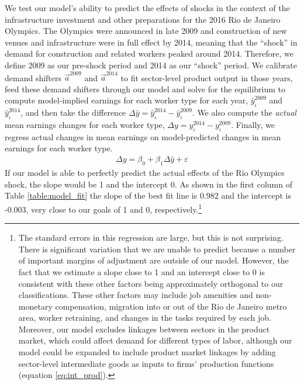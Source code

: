 \documentclass[12pt]{article}
\def\i{\iota}
\theoremstyle{definition}
\theoremstyle{plain}
\def\ve{\varepsilon}
\begin{document}
We test our model's ability to predict the effects of shocks in the context of the infrastructure investment and other preparations for the 2016 Rio de Janeiro Olympics. The Olympics were announced in late 2009 and construction of new venues and infrastructure were in full effect by 2014, meaning that the ``shock'' in demand for construction and related workers peaked around 2014. Therefore, we define 2009 as our pre-shock period and 2014 as our ``shock'' period. We calibrate demand shifters $\vec{a}^{2009}$ and $\vec{a}^{2014}$ to fit sector-level product output in those years, feed these demand shifters through our model and solve for the equilibrium to compute model-implied earnings for each worker type for each year, $\hat y_\i^{2009}$ and $\hat y_\i^{2014}$, and then take the difference $\Delta\hat y = \hat y_\i^{2014}-\hat y_\i^{2009}$. We also compute the \emph{actual} mean earnings changes for each worker type, $\Delta y = y_\i^{2014}- y_\i^{2009}$. Finally, we regress actual changes in mean earnings on model-predicted changes in mean earnings for each worker type. 
\begin{align}
	\Delta y  = \beta_0 + \beta_1 \Delta\hat y + \ve \label{eq:model_fit_reg}
\end{align}
If our model is able to perfectly predict the actual effects of the Rio Olympics shock, the slope would be 1 and the intercept 0. As shown in the first column of Table \ref{table:model_fit} the slope of the best fit line is 0.982 and the intercept is -0.003, very close to our goals of 1 and 0, respectively.\footnote{The standard errors in this regression are large, but this is not surprising. There is significant variation that we are unable to predict because a number of important margins of adjustment are outside of our model. However, the fact that we estimate a slope close to 1 and an intercept close to 0 is consistent with these other factors being approximately orthogonal to our classifications. These other factors may include job amenities and non-monetary compensation, migration into or out of the Rio de Janeiro metro area, worker retraining, and changes in the tasks required by each job. Moreover, our model excludes linkages between sectors in the product market, which could affect demand for different types of labor, although our model could be expanded to include product market linkages by adding sector-level intermediate goods as inputs to firms' production functions (equation \ref{eq:int_prod}).} 

%
\end{document}
